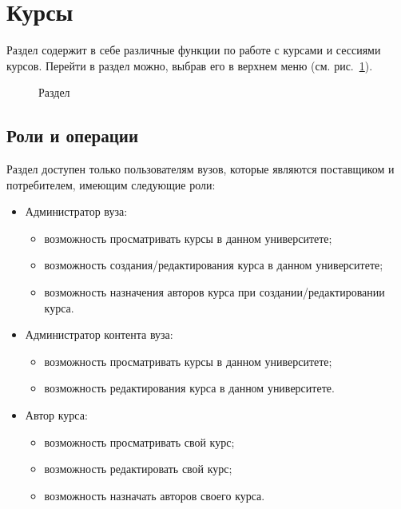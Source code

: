 \section{Курсы}
Раздел  содержит в себе различные функции по работе с курсами и сессиями курсов. 
Перейти в раздел можно, выбрав его в верхнем меню (см. рис.~\ref{img:course:top_menu}).

\begin{figure}[H]
	\caption{Раздел }
	\label{img:course:top_menu}
\end{figure}

\subsection{Роли и операции}

Раздел доступен только пользователям вузов, которые являются поставщиком и потребителем, имеющим следующие роли:

\begin{itemize}
	\item Администратор вуза:
	\begin{itemize}
		\item возможность просматривать курсы в данном университете;
		\item возможность создания/редактирования курса в данном университете;
		\item возможность назначения авторов курса при создании/редактировании курса.
	\end{itemize}
	\item Администратор контента вуза:
	\begin{itemize}
		\item возможность просматривать курсы в данном университете;
		\item возможность редактирования курса в данном университете.
	\end{itemize}
	\item Автор курса:
	\begin{itemize}
		\item возможность просматривать свой курс;
		\item возможность редактировать свой курс;
		\item возможность назначать авторов своего курса.
	\end{itemize}
\end{itemize}
